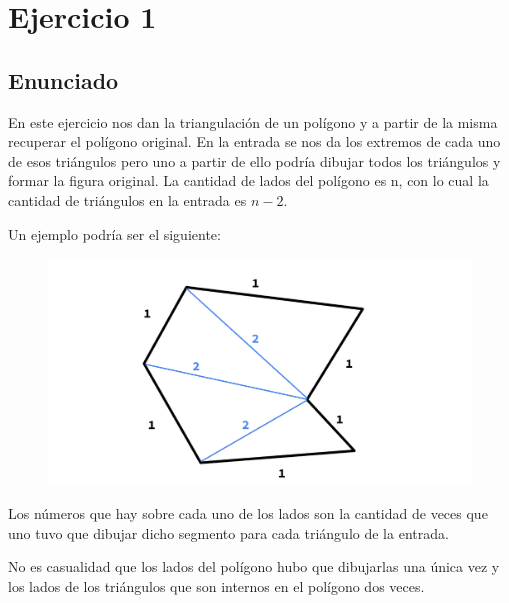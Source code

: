 \section{Ejercicio 1}

\subsection{Enunciado}

En este ejercicio nos dan la triangulación de un polígono y a partir de la misma recuperar el polígono original. En la entrada se nos da los extremos de cada uno de esos triángulos pero uno a partir de ello podría dibujar todos los triángulos y formar la figura original. La cantidad de lados del polígono es n, con lo cual la cantidad de triángulos en la entrada es $n-2$.\newline

Un ejemplo podría ser el siguiente:\newline

\begin{figure}[h!]
	\centering
	\includegraphics[scale = 0.25]{img/poligono-triangulado.png}
\end{figure}

Los números que hay sobre cada uno de los lados son la cantidad de veces que uno tuvo que dibujar dicho segmento para cada triángulo de la entrada.\newline

No es casualidad que los lados del polígono hubo que dibujarlas una única vez y los lados de los triángulos que son internos en el polígono dos veces.\newline

